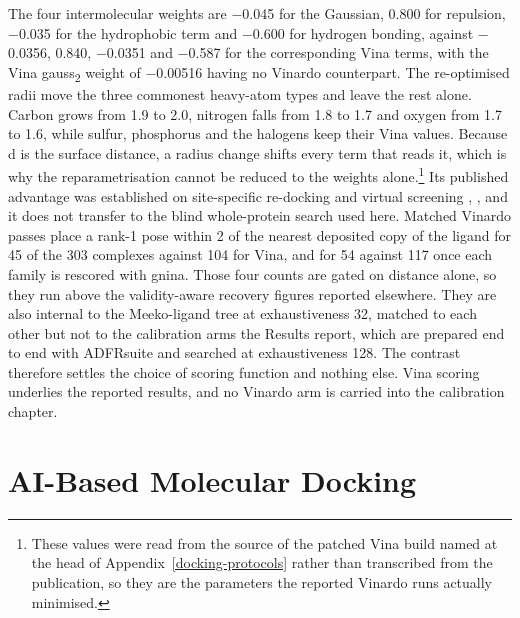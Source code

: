 The four intermolecular weights are \ensuremath{-}0.045 for the Gaussian, 0.800 for repulsion, \ensuremath{-}0.035 for the hydrophobic term and \ensuremath{-}0.600 for hydrogen bonding, against \ensuremath{-}0.0356, 0.840, \ensuremath{-}0.0351 and \ensuremath{-}0.587 for the corresponding Vina terms, with the Vina gauss\textsubscript{2} weight of \ensuremath{-}0.00516 having no Vinardo counterpart. The re-optimised radii move the three commonest heavy-atom types and leave the rest alone. Carbon grows from 1.9 to 2.0\angstrom{}, nitrogen falls from 1.8 to 1.7\angstrom{} and oxygen from 1.7 to 1.6\angstrom{}, while sulfur, phosphorus and the halogens keep their Vina values. Because d is the surface distance, a radius change shifts every term that reads it, which is why the reparametrisation cannot be reduced to the weights alone.\footnote{These values were read from the source of the patched Vina build named at the head of Appendix~\ref{docking-protocols} rather than transcribed from the publication, so they are the parameters the reported Vinardo runs actually minimised.} Its published advantage was established on site-specific re-docking and virtual screening \cite{ref073}, \cite{ref083}, and it does not transfer to the blind whole-protein search used here. Matched Vinardo passes place a rank-1 pose within 2\angstrom{} of the nearest deposited copy of the ligand for 45 of the 303 complexes against 104 for Vina, and for 54 against 117 once each family is rescored with gnina. Those four counts are gated on distance alone, so they run above the validity-aware recovery figures reported elsewhere. They are also internal to the Meeko-ligand tree at exhaustiveness 32, matched to each other but not to the calibration arms the Results report, which are prepared end to end with ADFRsuite and searched at exhaustiveness 128. The contrast therefore settles the choice of scoring function and nothing else. Vina scoring underlies the reported results, and no Vinardo arm is carried into the calibration chapter.

\hypertarget{ai-based-molecular-docking-1}{%
\section{AI-Based Molecular Docking}\label{ai-based-molecular-docking-1}}

